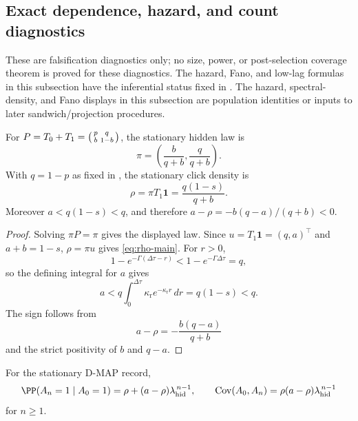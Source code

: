 \subsection{Exact dependence, hazard, and count diagnostics}

These are falsification diagnostics only; no size, power, or post-selection
coverage theorem is proved for these diagnostics.
The hazard, Fano, and low-lag formulas in this subsection have the inferential
status fixed in .  The hazard,
spectral-density, and Fano displays in this subsection are population
identities or inputs to later sandwich/projection procedures.

\begin{lemma}\label{lem:stationary-main}
For \(P=T_0+T_1=\begin{psmallmatrix}p&q\\ b&1-b\end{psmallmatrix}\), the
stationary hidden law is
\[
\pi=\left(\frac b{q+b},\frac{q}{q+b}\right).
\]
With \(q=1-p\) as fixed in , the
stationary click density is
\begin{equation}\label{eq:rho-main}
\rho=\pi T_1\mathbf1=\frac{q(1-s)}{q+b}.
\end{equation}
Moreover \(a<q(1-s)<q\), and therefore
\(a-\rho=-b(q-a)/(q+b)<0\).
\end{lemma}

\begin{proof}
Solving \(\pi P=\pi\) gives the displayed law.  Since
\(u=T_1\mathbf1=(q,a)^\top\) and \(a+b=1-s\), \(\rho=\pi u\) gives
\eqref{eq:rho-main}.  For \(r>0\),
\[
1-e^{-\Gamma(\Delta\tau-r)}<1-e^{-\Gamma\Delta\tau}=q,
\]
so the defining integral for \(a\) gives
\[
a<q\int_0^{\Delta\tau}\kappa_{\mathrm r}e^{-\kappa_{\mathrm r}r}\,dr
=q(1-s)<q .
\]
The sign follows from
\[
a-\rho=-\frac{b(q-a)}{q+b}
\]
and the strict positivity of \(b\) and \(q-a\).
\end{proof}

\begin{lemma}\label{lem:covariance-transfer-main}
For the stationary D-MAP record,
\begin{equation}\label{eq:cov-transfer-main}
\PP(A_n=1\mid A_0=1)
=\rho+(a-\rho)\lambda_{\mathrm{hid}}^{\,n-1},
\qquad
\operatorname{Cov}(A_0,A_n)=\rho(a-\rho)\lambda_{\mathrm{hid}}^{\,n-1}
\end{equation}
for \(n\ge1\).
\end{lemma}

